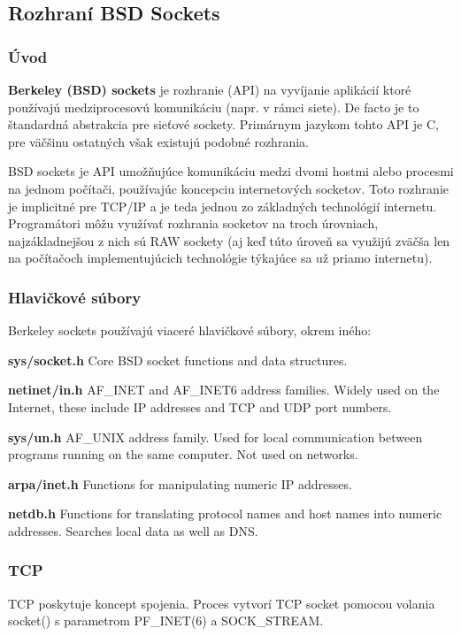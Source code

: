 \subsection{Rozhraní BSD Sockets}

\subsubsection*{Úvod}
\textbf{Berkeley (BSD) sockets} je rozhranie (API) na vyvíjanie aplikácií ktoré používajú medziprocesovú komunikáciu (napr. v rámci siete). De facto je to štandardná abstrakcia pre sieťové sockety. Primárnym jazykom tohto API je C, pre väčšinu ostatných však existujú podobné rozhrania.

BSD sockets je API umožňujúce komunikáciu medzi dvomi hostmi alebo procesmi na jednom počítači, používajúc koncepciu internetových socketov. Toto rozhranie je implicitné pre TCP/IP a je teda jednou zo základných technológií internetu. Programátori môžu využívať rozhrania socketov na troch úrovniach, najzákladnejšou z nich sú RAW sockety (aj keď túto úroveň sa využijú zväčša len na počítačoch implementujúcich technológie týkajúce sa už priamo internetu).

\subsubsection*{Hlavičkové súbory}
Berkeley sockets používajú viaceré hlavičkové súbory, okrem iného:
\begin{pitemize}
\item\textbf{sys/socket.h} Core BSD socket functions and data structures.
\item\textbf{netinet/in.h} AF\_INET and AF\_INET6 address families. Widely used on the Internet, these include IP addresses and TCP and UDP port numbers.
\item\textbf{sys/un.h} AF\_UNIX address family. Used for local communication between programs running on the same computer. Not used on networks.
\item\textbf{arpa/inet.h} Functions for manipulating numeric IP addresses.
\item\textbf{netdb.h} Functions for translating protocol names and host names into numeric addresses. Searches local data as well as DNS.
\end{pitemize}

\subsubsection*{TCP}
TCP poskytuje koncept spojenia. Proces vytvorí TCP socket pomocou volania socket() s parametrom PF\_INET(6) a SOCK\_STREAM.

